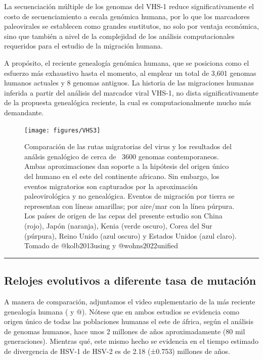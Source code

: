 \documentclass[
  12pt, krantz2,
  spanish,
]{krantz}
\begin{document}
La secuenciación múltiple de los genomas del VHS-1 reduce significativamente el costo de secuenciamiento a escala genómica humana, por lo que los marcadores paleovirales se establecen como grandes sustitutos, no solo por ventaja económica, sino que también a nivel de la complejidad de los análisis computacionales requeridos para el estudio de la migración humana.

A propósito, el reciente genealogía genómica humana, que se posiciona como el esfuerzo más exhaustivo hasta el momento, al emplear un total de 3,601 genomas humanos actuales y 8 genomas antiguos. La historia de las migraciones humanas inferida a partir del análisis del marcador viral VHS-1, no dista significativamente de la propuesta genealógica reciente, la cual es computacionalmente mucho más demandante.

\begin{figure}
\texttt{[image: figures/VHS3]} \caption{Comparación de las rutas migratorias del virus y los resultados del análsis genalógico de cerca de ~3600 genomas contemporaneos. Ambas aproximaciones dan soporte a la hipótesis del origen único del humano en el este del continente africano. Sin embargo, los eventos migratorios son capturados por la aproximación paleovirológica y no genealógica. Eventos de migración por tierra se representan con líneas amarillas; por aire/mar con la línea púrpura. Los países de origen de las cepas del presente estudio son China (rojo), Japón (naranja), Kenia (verde oscuro), Corea del Sur (púrpura), Reino Unido (azul oscuro) y Estados Unidos (azul claro). Tomado de @kolb2013using y @wohns2022unified}\label{fig:migratory}
\end{figure}

\begin{center}\rule{0.5\linewidth}{0.5pt}\end{center}

\hypertarget{relojes-evolutivos-a-diferente-tasa-de-mutaciuxf3n}{%
\subsection{Relojes evolutivos a diferente tasa de mutación}\label{relojes-evolutivos-a-diferente-tasa-de-mutaciuxf3n}}

A manera de comparación, adjuntamos el video suplementario de la más reciente genealogía humana (\citet{kolb2013using} y @\citet{wohns2022unified}). Nótese que en ambos estudios se evidencia como origen único de todas las poblaciones humanas el este de áfrica, según el análisis de genomas humanos, hace unos 2 millones de años aproximadamente (80 mil generaciones). Mientras qué, este mismo hecho se evidencia en el tiempo estimado de divergencia de HSV-1 de HSV-2 es de 2.18 (±0.753) millones de años.
\end{document}
